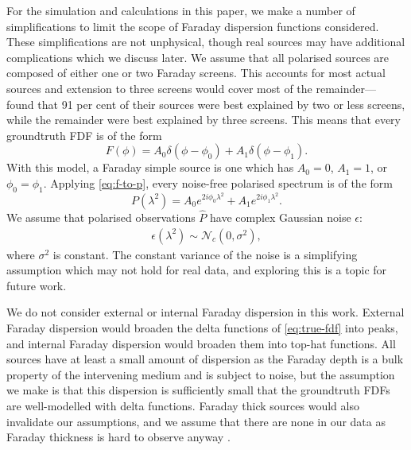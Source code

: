     For the simulation and calculations in this paper, we make a number of simplifications to limit the scope of Faraday dispersion functions considered. These simplifications are not unphysical, though real sources may have additional complications which we discuss later. We assume that all polarised sources are composed of either one or two Faraday screens. This accounts for most actual sources \citep{anderson_broadband_2015} and extension to three screens would cover most of the remainder---\citet{osullivan_broad-band_2017} found that 91 per cent of their sources were best explained by two or less screens, while the remainder were best explained by three screens. This means that every groundtruth FDF is of the form
    \begin{equation}
        \label{eq:faraday-true-fdf}
        F(\phi) = A_0 \delta(\phi - \phi_0) + A_1 \delta(\phi - \phi_1).
    \end{equation}
    With this model, a Faraday simple source is one which has $A_0 = 0$, $A_1 = 1$, or $\phi_0 = \phi_1$. Applying \autoref{eq:f-to-p}, every noise-free polarised spectrum is of the form
    \begin{equation}
        \label{eq:faraday-true-pol}
        P(\lambda^2) = A_0 e^{2i\phi_0\lambda^2} + A_1 e^{2i\phi_1\lambda^2}.
    \end{equation}
    We assume that polarised observations $\hat P$ have complex Gaussian noise $\epsilon$:
    \begin{align}
        \label{eq:faraday-pol-noise}
        \epsilon(\lambda^2) \sim \mathcal N_c(0, \sigma^2),
    \end{align}
    where $\sigma^2$ is constant. The constant variance of the noise is a simplifying assumption which may not hold for real data, and exploring this is a topic for future work.

    We do not consider external or internal Faraday dispersion in this work. External Faraday dispersion would broaden the delta functions of \autoref{eq:true-fdf} into peaks, and internal Faraday dispersion would broaden them into top-hat functions. All sources have at least a small amount of dispersion as the Faraday depth is a bulk property of the intervening medium and is subject to noise, but the assumption we make is that this dispersion is sufficiently small that the groundtruth FDFs are well-modelled with delta functions. Faraday thick sources would also invalidate our assumptions, and we assume that there are none in our data as Faraday thickness is hard to observe anyway \citeneeded.


